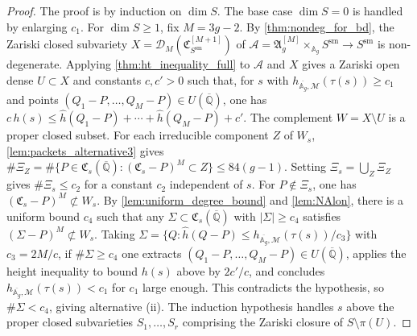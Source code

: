 \begin{proof}
  The proof is by induction on \(\dim S\).
  The base case \(\dim S = 0\) is handled by enlarging \(c_1\).
  For \(\dim S \ge 1\), fix \(M = 3g - 2\). By \cref{thm:nondeg_for_bd},
  the Zariski closed subvariety
  \(X = \mathscr{D}_M(\mathfrak{C}_{S^{\mathrm{sm}}}^{[M+1]})\)
  of \(\mathcal{A} = \mathfrak{A}_g^{[M]} \times_{\mathbb{A}_g} S^{\mathrm{sm}} \to S^{\mathrm{sm}}\)
  is non-degenerate. Applying \cref{thm:ht_inequality_full} to \(\mathcal{A}\) and \(X\)
  gives a Zariski open dense \(U \subset X\) and constants \(c, c' > 0\) such that,
  for \(s\) with \(h_{\overline{\mathbb{A}_g},\mathcal{M}}(\tau(s)) \ge c_1\)
  and points \((Q_1 - P, \ldots, Q_M - P) \in U(\overline{\mathbb{Q}})\),
  one has \(c\,h(s) \le \hat{h}(Q_1 - P) + \cdots + \hat{h}(Q_M - P) + c'\).
  The complement \(W = X \setminus U\) is a proper closed subset.
  For each irreducible component \(Z\) of \(W_s\),
  \cref{lem:packets_alternative3} gives
  \(\#\Xi_Z = \#\{P \in \mathfrak{C}_s(\overline{\mathbb{Q}}) : (\mathfrak{C}_s - P)^M \subset Z\} \le 84(g-1)\).
  Setting \(\Xi_s = \bigcup_Z \Xi_Z\) gives \(\#\Xi_s \le c_2\) for a constant
  \(c_2\) independent of \(s\).
  For \(P \notin \Xi_s\), one has \((\mathfrak{C}_s - P)^M \not\subset W_s\).
  By \cref{lem:uniform_degree_bound} and \cref{lem:NAlon}, there is a uniform
  bound \(c_4\) such that any \(\Sigma \subset \mathfrak{C}_s(\overline{\mathbb{Q}})\)
  with \(|\Sigma| \ge c_4\) satisfies \((\Sigma - P)^M \not\subset W_s\).
  Taking \(\Sigma = \{Q : \hat{h}(Q - P) \le h_{\overline{\mathbb{A}_g},\mathcal{M}}(\tau(s))/c_3\}\)
  with \(c_3 = 2M/c\), if \(\#\Sigma \ge c_4\) one extracts
  \((Q_1 - P, \ldots, Q_M - P) \in U(\overline{\mathbb{Q}})\),
  applies the height inequality to bound \(h(s)\) above by \(2c'/c\),
  and concludes \(h_{\overline{\mathbb{A}_g},\mathcal{M}}(\tau(s)) < c_1\)
  for \(c_1\) large enough. This contradicts the hypothesis,
  so \(\#\Sigma < c_4\), giving alternative (ii).
  The induction hypothesis handles \(s\) above the proper closed
  subvarieties \(S_1, \ldots, S_r\) comprising the Zariski closure of \(S \setminus \pi(U)\).
\end{proof}

